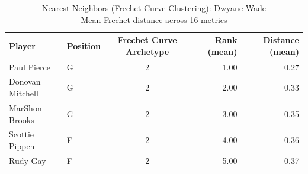 \begin{table}[t]
\caption*{
{\fontsize{20}{25} Nearest Neighbors (Frechet Curve Clustering): Dwyane Wade\fontsize{12}{15}\selectfont } \\ 
{\fontsize{14}{17}\selectfont  Mean Frechet distance across 16 metrics\fontsize{12}{15}\selectfont }
} 
\fontsize{12.0pt}{14.0pt}\selectfont
\begin{tabular*}{\linewidth}{@{\extracolsep{\fill}}llcrr}
\toprule
Player & Position & Frechet Curve Archetype & Rank (mean) & Distance (mean) \\ 
\midrule\addlinespace[2.5pt]
Paul Pierce & G & 2 & 1.00 & 0.27 \\ 
Donovan Mitchell & G & 2 & 2.00 & 0.33 \\ 
MarShon Brooks & G & 2 & 3.00 & 0.35 \\ 
Scottie Pippen & F & 2 & 4.00 & 0.36 \\ 
Rudy Gay & F & 2 & 5.00 & 0.37 \\ 
\bottomrule
\end{tabular*}
\end{table}


